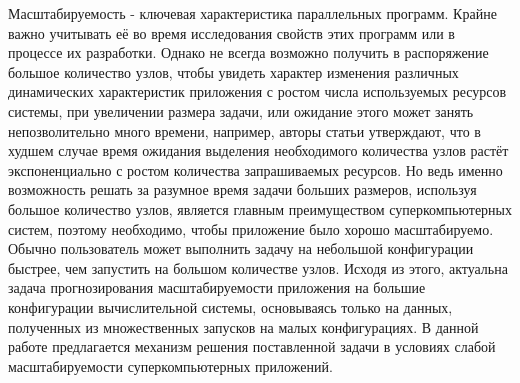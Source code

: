 	Масштабируемость - ключевая характеристика параллельных программ. Крайне важно учитывать её во время исследования свойств этих программ или в процессе их разработки.
	Однако не всегда возможно получить в распоряжение большое количество узлов, чтобы увидеть характер изменения различных динамических характеристик приложения с ростом числа используемых ресурсов системы, при увеличении размера задачи, или ожидание этого может занять непозволительно много времени, например, авторы статьи \cite{log_main} утверждают, что в худшем случае время ожидания выделения необходимого количества узлов растёт экспоненциально с ростом количества запрашиваемых ресурсов. Но ведь именно возможность решать за разумное время задачи больших размеров, используя большое количество узлов, является главным преимуществом суперкомпьютерных систем, поэтому необходимо, чтобы приложение было хорошо масштабируемо. Обычно пользователь может выполнить задачу на небольшой конфигурации быстрее, чем запустить на большом количестве узлов. Исходя из этого, актуальна задача прогнозирования масштабируемости приложения на большие конфигурации вычислительной системы, основываясь только на данных, полученных из множественных запусков на малых конфигурациях.
	В данной работе предлагается механизм решения поставленной задачи в условиях слабой масштабируемости суперкомпьютерных приложений.
	
\clearpage
